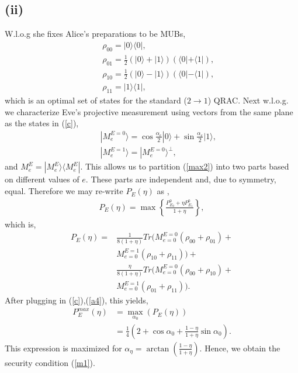 \documentclass[smallextended]{svjour3}
\newcommand{\be}{\begin{eqnarray}}
\newcommand{\ee}{\end{eqnarray}}
\begin{document}
\subsection*{(ii)}
W.l.o.g she fixes Alice's preparations to be MUBs,
\begin{eqnarray}
&& \rho_{00}=|0\rangle\langle0|, \nonumber \\
&& \rho_{01}=\frac{1}{2}(|0\rangle+|1\rangle)(\langle0|+\langle1|), \nonumber \\
&& \rho_{10}=\frac{1}{2}(|0\rangle-|1\rangle)(\langle0|-\langle1|), \nonumber \\
&& \rho_{11}=|1\rangle\langle 1|, \label{c}
\end{eqnarray}
which is an optimal set of states for the standard ($2\to1$) QRAC. Next w.l.o.g. we characterize Eve's projective measurement using vectors from the same plane as the states in (\ref{c}),
\begin{eqnarray}
&& |M_e^{E=0}\rangle=\cos\frac{\alpha_e}{2}|0\rangle+\sin\frac{\alpha_e}{2}|1\rangle, \nonumber \\
&& |M_e^{E=1}\rangle = |M_e^{E=0}\rangle^\perp \label{a4},
\end{eqnarray}
and $M_e^{E}=|M_e^E\rangle\langle M_e^E|$. This allows us to partition (\ref{max2}) into two parts based on different values of $e$. These parts are independent and, due to symmetry, equal. Therefore we may re-write $P_E(\eta)$ as ,
\be
P_E(\eta)=\max\left\{\frac{P_{E_0}^0+\eta P_{E_1}^0}{1+\eta}\right\},
\ee 
which is,
\begin{equation}
\begin{split}
P_E(\eta)= &
\frac{1}{8(1+\eta)}Tr\bigg(M_{e=0}^{E=0}(\rho_{00}+\rho_{01})+ \\ & M_{e=0}^{E=1}(\rho_{10}+\rho_{11})\bigg)
+ \\& \frac{\eta}{8(1+\eta)} Tr\bigg(M_{e=0}^{E=0}(\rho_{00}+\rho_{10})+ \\ & M_{e=0}^{E=1}(\rho_{01}+\rho_{11})\bigg).
\end{split}
\end{equation}
After plugging in (\ref{c}),(\ref{a4}), this yields,
\begin{equation}
\begin{split}
P_E^{max}(\eta)& =\max_{\alpha_0}(P_E(\eta)) \\ & = \frac{1}{4}\left(2+\cos \alpha_0+\frac{1-\eta}{1+\eta}\sin\alpha_0\right).
\end{split}
\end{equation}
This expression is maximized for $\alpha_\eta=\arctan\left(\frac{1-\eta}{1+\eta}\right)$. Hence, we obtain the security condition (\ref{m1}).
\end{document}
